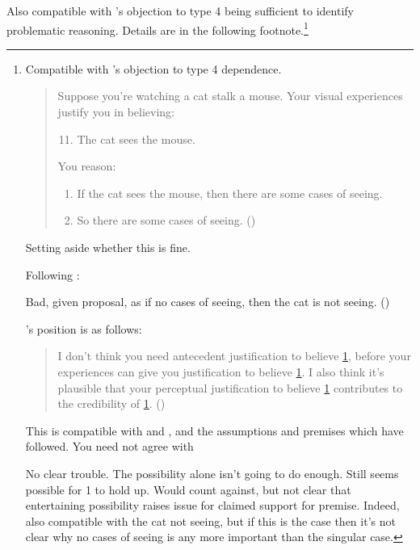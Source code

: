 \begin{note}
  Also compatible with \citeauthor{Pryor:2004ws}'s objection to type 4 being sufficient to identify problematic reasoning.
  Details are in the following footnote.\footnote{
  Compatible with \citeauthor{Pryor:2004ws}'s objection to type 4 dependence.

    \begin{quote}
      Suppose you're watching a cat stalk a mouse. Your visual experiences justify you in believing:

      \begin{enumerate}[label=(\arabic*), ref=(\arabic*)]
        \setcounter{enumi}{10}
      \item\label{illu:Pryor:cat:1} The cat sees the mouse.
      \end{enumerate}

      You reason:

      \begin{enumerate}[label=(\arabic*), ref=(\arabic*), resume]
      \item\label{illu:Pryor:cat:2} If the cat sees the mouse, then there are some cases of seeing.
      \item\label{illu:Pryor:cat:3} So there are some cases of seeing.\nolinebreak
        \mbox{}\hfill\mbox{(\citeyear[361]{Pryor:2004ws})}
      \end{enumerate}
    \end{quote}

  Setting aside whether this is fine.

  Following \citeauthor{Pryor:2004ws}:

  Bad, given proposal, as if no cases of seeing, then the cat is not seeing. (\citeyear[361]{Pryor:2004ws})

  \citeauthor{Pryor:2004ws}'s position is as follows:

  \begin{quote}
    I don't think you need antecedent justification to believe \ref{illu:Pryor:cat:3}, before your experiences can give you justification to believe \ref{illu:Pryor:cat:1}.
    I also think it's plausible that your perceptual justification to believe \ref{illu:Pryor:cat:1} contributes to the credibility of \ref{illu:Pryor:cat:3}.\nolinebreak
    \mbox{}\hfill\mbox{(\citeyear[361]{Pryor:2004ws})}
  \end{quote}

  This is compatible with \ideaCSA{} and \ideaCSB{}, and the assumptions and premises which have followed.
  You need not agree with \citeauthor{Pryor:2004ws}

  No clear trouble.
  The possibility alone isn't going to do enough.
  Still seems possible for 1 to hold up.
  Would count against, but not clear that entertaining possibility raises issue for claimed support for premise.
  Indeed, also compatible with the cat not seeing, but if this is the case then it's not clear why no cases of seeing is any more important than the singular case.
  }
\end{note}

